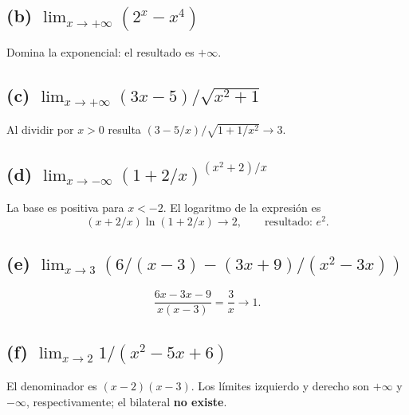 \documentclass[11pt]{article}
\begin{document}
\subsection*{(b) $\displaystyle\lim_{x\to+\infty}(2^x-x^4)$}
Domina la exponencial: el resultado es $\boxed{+\infty}$.
\subsection*{(c) $\displaystyle\lim_{x\to+\infty}(3x-5)/\sqrt{x^2+1}$}
Al dividir por $x>0$ resulta $(3-5/x)/\sqrt{1+1/x^2}\to\boxed{3}$.
\subsection*{(d) $\displaystyle\lim_{x\to-\infty}(1+2/x)^{(x^2+2)/x}$}
La base es positiva para $x<-2$. El logaritmo de la expresión es
\[(x+2/x)\ln(1+2/x)\longrightarrow2,\qquad\text{resultado: }\boxed{e^2}.\]
\subsection*{(e) $\displaystyle\lim_{x\to3}\left(6/(x-3)-(3x+9)/(x^2-3x)\right)$}
\[\frac{6x-3x-9}{x(x-3)}=\frac3x\longrightarrow\boxed{1}.\]
\subsection*{(f) $\displaystyle\lim_{x\to2}1/(x^2-5x+6)$}
El denominador es $(x-2)(x-3)$. Los límites izquierdo y derecho son $+\infty$ y $-\infty$, respectivamente; el bilateral \textbf{no existe}.
\end{document}
